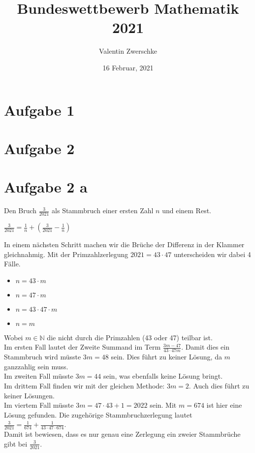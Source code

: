 \documentclass{article}
\title{Bundeswettbewerb Mathematik 2021}
\author{Valentin Zwerschke}
\date{16 Februar, 2021}
\begin{document}
\maketitle

\section*{Aufgabe 1}

\section*{Aufgabe 2}
\section*{Aufgabe 2 a}
Den Bruch $\frac{3}{2021}$ als Stammbruch einer ersten Zahl $n$ und einem Rest.
\begin{center}
    $\frac{3}{2021} = \frac{1}{n} + (\frac{3}{2021} - \frac{1}{n})$
\end{center}
In einem nächsten Schritt machen wir die Brüche der Differenz in der Klammer gleichnahmig. Mit der Primzahlzerlegung $2021 = 43 \cdot 47$ unterscheiden wir dabei 4 Fälle.
\begin{itemize}
    \item $n = 43 \cdot m$
    \item $n = 47 \cdot m$
    \item $n = 43 \cdot 47 \cdot m$
    \item $n = m$
\end{itemize}
Wobei \(m \in \mathbb{N}\) die nicht durch die Primzahlen (43 oder 47) teilbar ist.\\Im ersten Fall lautet der Zweite Summand im Term \(\frac{3m-47}{43 \cdot 47m}\). Damit dies ein Stammbruch wird müsste \(3m = 48\) sein. Dies führt zu keiner Lösung, da \(m\) ganzzahlig sein muss.\\Im zweiten Fall müsste \(3m = 44\) sein, was ebenfalls keine Lösung bringt.\\
Im drittem Fall finden wir mit der gleichen Methode: \(3m = 2\). Auch dies führt zu keiner Lösungen.\\
Im viertem Fall müsste \(3m = 47 \cdot 43 + 1 = 2022\) sein. Mit \(m = 674\) ist hier eine Lösung gefunden. Die zugehörige Stammbruchzerlegung lautet \(\frac{3}{2021} = \frac{1}{674} + \frac{1}{43 \cdot 47 \cdot 674}\).\\
Damit ist bewiesen, dass es nur genau eine Zerlegung ein zweier Stammbrüche gibt bei \(\frac{3}{2021}\).
\end{document}
